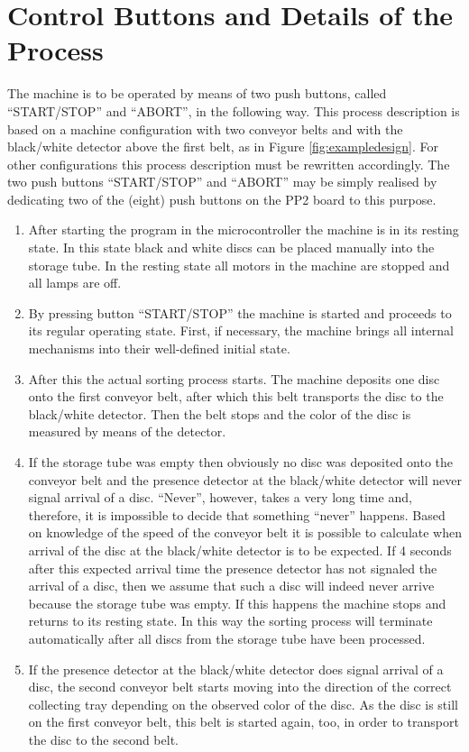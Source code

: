 \documentclass[a4paper,oneside,11pt]{report}
\begin{document}
\section{Control Buttons and Details of the Process}
The machine is to be operated by means of two push buttons, called “START/STOP” and “ABORT”, in the following way. This process description is based on a machine configuration with two conveyor belts and with the black/white detector above the first belt, as in Figure \ref{fig:exampledesign}. For other configurations this process description must be rewritten accordingly. The two push buttons “START/STOP” and “ABORT” may be simply realised by dedicating two of the (eight) push buttons on the PP2 board to
this purpose.

\begin{enumerate}
\item After starting the program in the microcontroller the machine is in its resting state. In this state black and white discs can be placed manually into the storage tube. In the resting state all motors in the machine are stopped and all lamps are off.
\item By pressing button “START/STOP” the machine is started and proceeds to its regular operating state. First, if necessary, the machine brings all internal mechanisms into their well-defined initial state.
\item After this the actual sorting process starts. The machine deposits one disc onto the first conveyor belt, after which this belt transports the disc to the black/white detector. Then the belt stops and the color of the disc is measured by means of the detector.
\item If the storage tube was empty then obviously no disc was deposited onto the conveyor belt and the presence detector at the black/white detector will never signal arrival of a disc. “Never”, however, takes a very long time and, therefore, it is impossible to decide that something “never” happens. Based on knowledge of the speed of the conveyor belt it is possible to calculate when arrival of the disc at the black/white detector is to be expected. If 4 seconds after this expected arrival time the presence detector has not signaled the arrival of a disc, then we assume that such a disc will indeed never arrive because the storage tube was empty. If this happens the machine stops and returns to its resting state. In this way the sorting process will terminate automatically after all discs from the storage tube have been processed.
\item If the presence detector at the black/white detector does signal arrival of a disc, the second conveyor belt starts moving into the direction of the correct collecting tray depending on the observed color of the disc. As the disc is still on the first conveyor belt, this belt is started again, too, in order to transport the disc to the second belt.

\end{enumerate}
\end{document}
